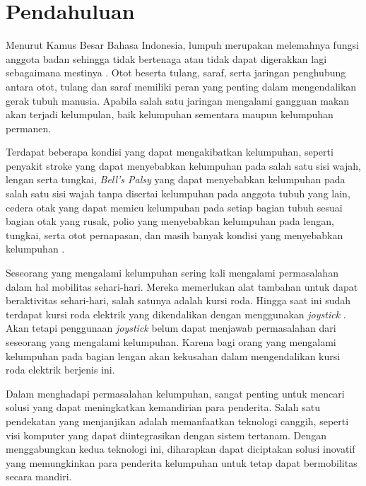 \section{Pendahuluan}
\label{sec:pendahuluan}


Menurut Kamus Besar Bahasa Indonesia, lumpuh merupakan melemahnya fungsi anggota badan sehingga tidak bertenaga atau tidak dapat digerakkan lagi sebagaimana mestinya \cite{Daring_2016}. Otot beserta tulang, saraf, serta jaringan penghubung antara otot, tulang dan saraf memiliki peran yang penting dalam mengendalikan gerak tubuh manusia. Apabila salah satu jaringan mengalami gangguan makan akan terjadi kelumpulan, baik kelumpuhan sementara maupun kelumpuhan permanen.

Terdapat beberapa kondisi yang dapat mengakibatkan kelumpuhan, seperti penyakit stroke yang dapat menyebabkan kelumpuhan pada salah satu sisi wajah, lengan serta tungkai, \emph{Bell's Palsy} yang dapat menyebabkan kelumpuhan pada salah satu sisi wajah tanpa disertai kelumpuhan pada anggota tubuh yang lain, cedera otak yang dapat memicu kelumpuhan pada setiap bagian tubuh sesuai bagian otak yang rusak, polio yang menyebabkan kelumpuhan pada lengan, tungkai, serta otot pernapasan, dan masih banyak kondisi yang menyebabkan kelumpuhan \cite{Pansawira_2022}.

Seseorang yang mengalami kelumpuhan sering kali mengalami permasalahan dalam hal mobilitas sehari-hari. Mereka memerlukan alat tambahan untuk dapat beraktivitas sehari-hari, salah satunya adalah kursi roda. Hingga saat ini sudah terdapat kursi roda elektrik yang dikendalikan dengan menggunakan \emph{joystick} \cite{choi2019motion}. Akan tetapi penggunaan \emph{joystick} belum dapat menjawab permasalahan dari seseorang yang mengalami kelumpuhan. Karena bagi orang yang mengalami kelumpuhan pada bagian lengan akan kekusahan dalam mengendalikan kursi roda elektrik berjenis ini.

Dalam menghadapi permasalahan kelumpuhan, sangat penting untuk mencari solusi yang dapat meningkatkan kemandirian para penderita. Salah satu pendekatan yang menjanjikan adalah memanfaatkan teknologi canggih, seperti visi komputer yang dapat diintegrasikan dengan sistem tertanam. Dengan menggabungkan kedua teknologi ini, diharapkan dapat diciptakan solusi inovatif yang memungkinkan para penderita kelumpuhan untuk tetap dapat bermobilitas secara mandiri.

